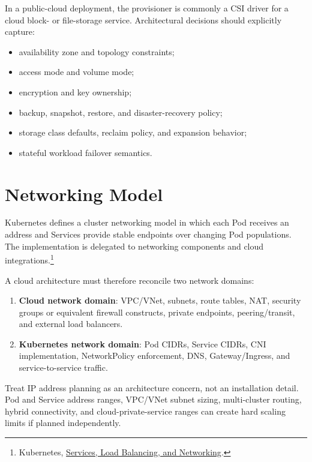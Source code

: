 \documentclass[11pt]{article}
\newcommand{\src}[2]{\href{#2}{#1}}
\begin{document}
In a public-cloud deployment, the provisioner is commonly a CSI driver for a cloud block- or file-storage service. Architectural decisions should explicitly capture:

\begin{itemize}
  \item availability zone and topology constraints;
  \item access mode and volume mode;
  \item encryption and key ownership;
  \item backup, snapshot, restore, and disaster-recovery policy;
  \item storage class defaults, reclaim policy, and expansion behavior;
  \item stateful workload failover semantics.
\end{itemize}

\section{Networking Model}

Kubernetes defines a cluster networking model in which each Pod receives an address and Services provide stable endpoints over changing Pod populations. The implementation is delegated to networking components and cloud integrations.\footnote{Kubernetes, \src{Services, Load Balancing, and Networking}{https://kubernetes.io/docs/concepts/services-networking/}.}

A cloud architecture must therefore reconcile two network domains:

\begin{enumerate}
  \item \textbf{Cloud network domain}: VPC/VNet, subnets, route tables, NAT, security groups or equivalent firewall constructs, private endpoints, peering/transit, and external load balancers.
  \item \textbf{Kubernetes network domain}: Pod CIDRs, Service CIDRs, CNI implementation, NetworkPolicy enforcement, DNS, Gateway/Ingress, and service-to-service traffic.
\end{enumerate}

\begin{practicebox}
Treat IP address planning as an architecture concern, not an installation detail. Pod and Service address ranges, VPC/VNet subnet sizing, multi-cluster routing, hybrid connectivity, and cloud-private-service ranges can create hard scaling limits if planned independently.
\end{practicebox}
\end{document}
